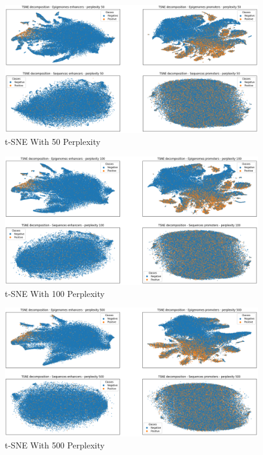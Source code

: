\documentclass{article}
\begin{document}
\begin{figure}
    \centering
    \includegraphics[width=12cm]{image/+50_TSNE.png}
    \caption{t-SNE With 50 Perplexity}
    \label{fig:50_Perplexity}
\end{figure}

\begin{figure}
    \centering
    \includegraphics[width=12cm]{image/+100_TSNE.png}
    \caption{t-SNE With 100 Perplexity}
    \label{fig:100_Perplexity}
\end{figure}

\begin{figure}
    \centering
    \includegraphics[width=12cm]{image/+500_TSNE.png}
    \caption{t-SNE With 500 Perplexity}
    \label{fig:500_Perplexity}
\end{figure}
\end{document}

